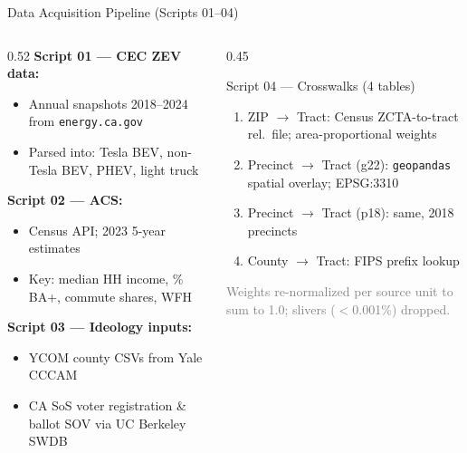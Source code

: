 \documentclass[aspectratio=169,t]{beamer}
\newcommand{\src}[1]{\footnotesize\textcolor{gray}{#1}}
\begin{document}
\begin{frame}{Data Acquisition Pipeline (Scripts 01--04)}
  \begin{columns}[T]
    \begin{column}{0.52\textwidth}
      \textbf{Script 01 --- CEC ZEV data:}
      \begin{itemize}\small
        \item Annual snapshots 2018--2024 from \texttt{energy.ca.gov}
        \item Parsed into: Tesla BEV, non-Tesla BEV, PHEV, light truck
      \end{itemize}

      \vspace{0.1em}
      \textbf{Script 02 --- ACS:}
      \begin{itemize}\small
        \item Census API; 2023 5-year estimates
        \item Key: median HH income, \% BA+, commute shares, WFH
      \end{itemize}

      \vspace{0.1em}
      \textbf{Script 03 --- Ideology inputs:}
      \begin{itemize}\small
        \item YCOM county CSVs from Yale CCCAM
        \item CA SoS voter registration \& ballot SOV via UC Berkeley SWDB
      \end{itemize}
    \end{column}
    \begin{column}{0.45\textwidth}
      \begin{block}{Script 04 --- Crosswalks (4 tables)}
        \begin{enumerate}\small
          \item ZIP $\to$ Tract: Census ZCTA-to-tract rel.\ file;
                area-proportional weights
          \item Precinct $\to$ Tract (g22): \texttt{geopandas} spatial overlay;
                EPSG:3310
          \item Precinct $\to$ Tract (p18): same, 2018 precincts
          \item County $\to$ Tract: FIPS prefix lookup
        \end{enumerate}
      \end{block}
      \src{Weights re-normalized per source unit to sum to 1.0;
      slivers ($<$0.001\%) dropped.}
    \end{column}
  \end{columns}
\end{frame}
\end{document}

